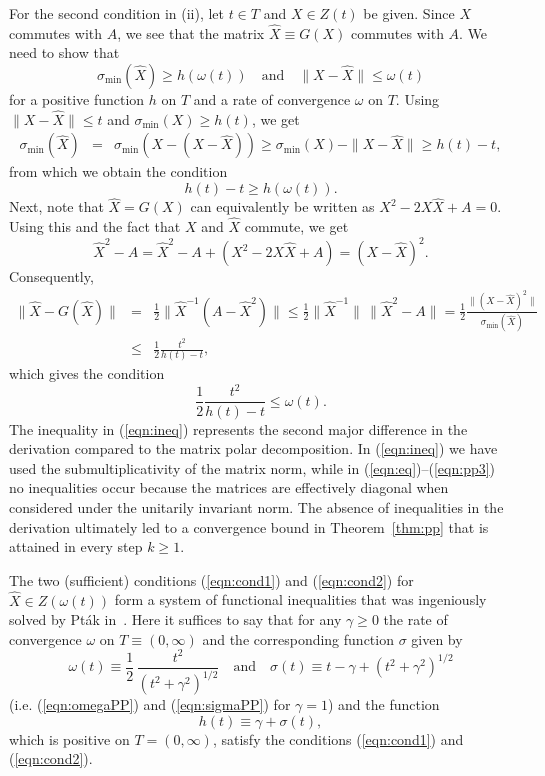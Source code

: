 \documentclass{siamltex}
\begin{document}
For the second condition in (ii), let $t\in T$ and $X\in Z(t)$ be given.
Since $X$ commutes with $A$, we see that the matrix $\widehat{X}\equiv G(X)$
commutes with $A$. We need to show that
$$\sigma_{\min}(\widehat{X})\geq h(\omega(t))\quad\mbox{and}\quad
\|X-\widehat{X}\|\leq \omega(t)$$
for a positive function $h$ on $T$ and a rate of convergence $\omega$ on $T$. Using
$\|X-\widehat{X}\|\leq t$ and $\sigma_{\min}(X)\geq h(t)$,
we get
\begin{eqnarray*}
\sigma_{\min}(\widehat{X}) &=&\sigma_{\min}(X-(X-\widehat{X}))\geq \sigma_{\min}(X)-\|X-\widehat{X}\|
\geq h(t)-t,
\end{eqnarray*}
from which we obtain the condition
\begin{equation}\label{eqn:cond1}
h(t)-t \geq h(\omega(t)).
\end{equation}
Next, note that $\widehat{X}=G(X)$ can equivalently be written as
$X^2-2 X\widehat{X}+A=0.$
Using this and the fact that $X$ and $\widehat{X}$ commute, we get
\begin{equation}\label{eqn:Asquare}
\widehat{X}^2-A = \widehat{X}^2-A + (X^2-2 X\widehat{X}+A)=(X-\widehat{X})^2.
\end{equation}
Consequently,
\begin{eqnarray}
\|\widehat{X}-G(\widehat{X})\|&=& 
\frac12 \|\widehat{X}^{-1}(A-\widehat{X}^2)\|
\leq \frac12 \|\widehat{X}^{-1}\|\,\|\widehat{X}^2-A\|
= \frac12 \frac{\|(X-\widehat{X})^2\|}{\sigma_{\min}(\widehat{X})}\label{eqn:ineq}\\
&\leq& \frac12 \frac{t^2}{h(t)-t},\nonumber
\end{eqnarray}
which gives the condition
\begin{equation}\label{eqn:cond2}
\frac12 \frac{t^2}{h(t)-t}\leq \omega(t).
\end{equation}
The inequality in (\ref{eqn:ineq}) represents the second major difference in the derivation
compared to the matrix polar decomposition. In (\ref{eqn:ineq}) we have
used the submultiplicativity of the matrix norm, while in (\ref{eqn:eq})--(\ref{eqn:pp3})
no inequalities occur because the matrices are effectively diagonal when considered under the
unitarily invariant norm. The absence of inequalities in the derivation ultimately led to
a convergence bound in Theorem~\ref{thm:pp} that is attained in every step $k\geq 1$.

The two (sufficient) conditions (\ref{eqn:cond1}) and (\ref{eqn:cond2}) for
$\widehat{X}\in Z(\omega(t))$ form a system of functional
inequalities that was ingeniously solved by Pt\'ak in~\cite{Pta76a}. Here it suffices to
say that for any $\gamma\geq 0$ the rate of convergence $\omega$ on $T\equiv (0,\infty)$
and the corresponding function $\sigma$ given by
\begin{equation}\label{eqn:rate}
\omega(t)\equiv \frac12\,\frac{t^2}{(t^2+\gamma^2)^{1/2}}\quad\mbox{and}\quad
\sigma(t)\equiv t-\gamma+(t^2+\gamma^2)^{1/2}
\end{equation}
(i.e. (\ref{eqn:omegaPP}) and (\ref{eqn:sigmaPP}) for $\gamma=1$) and the function
$$h(t)\equiv \gamma+\sigma(t),$$
which is positive on $T=(0,\infty)$, satisfy the conditions (\ref{eqn:cond1}) and
(\ref{eqn:cond2}).
\end{document}
